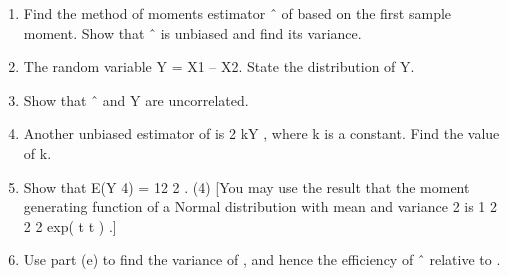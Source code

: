 \begin{enumerate}
\begin{enumerate}
\item Find the method of moments estimator ˆ of based on the first sample
moment. Show that ˆ is unbiased and find its variance.
\item  The random variable Y = X1 – X2. State the distribution of Y.
\item Show that ˆ and Y are uncorrelated.
\item Another unbiased estimator of is 2 kY , where k is a constant. Find the
value of k.
\item Show that E(Y
4) = 12
2
.
(4)
[You may use the result that the moment generating function of a Normal
distribution with mean and variance
2 is 1 2 2
2 exp( t t ) .]
\item Use part (e) to find the variance of , and hence the efficiency of ˆ relative
to .
\end{enumerate}


\end{enumerate}
